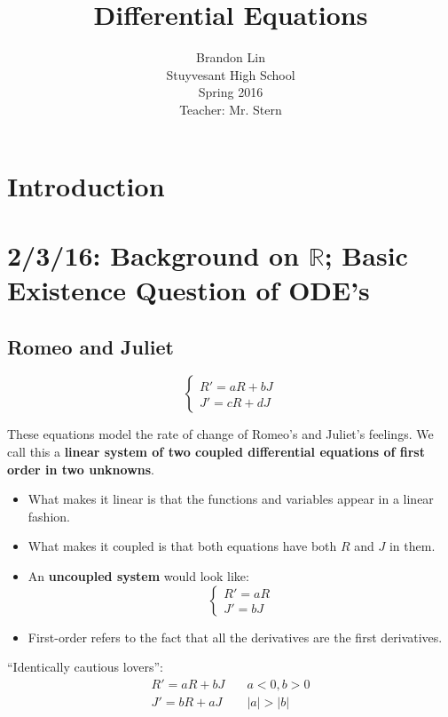 \documentclass[12pt]{article}
\begin{document}
\title{Differential Equations}
\author{Brandon Lin\\Stuyvesant High School\\Spring 2016\\Teacher: Mr. Stern}
\maketitle
\newpage

\tableofcontents 

\newpage
\section*{Introduction}

\section{2/3/16: Background on $\mathbb{R}$; Basic Existence Question of ODE's}
\subsection{Romeo and Juliet}
\[
\begin{cases}
R' = aR + bJ \\
J' = cR + dJ 
\end{cases}
\]

These equations model the rate of change of Romeo's and Juliet's feelings. We call this a \textbf{linear system of two coupled differential equations of first order in two unknowns}. 
\begin{itemize}
\item What makes it linear is that the functions and variables appear in a linear fashion. 
\item What makes it coupled is that both equations have both $R$ and $J$ in them.
\item An \textbf{uncoupled system} would look like:
\[
\begin{cases}
R' = aR \\
J' = bJ
\end{cases}
\] 
\item First-order refers to the fact that all the derivatives are the first derivatives.
\end{itemize}
``Identically cautious lovers'':
\[
\begin{aligned} 
R' = aR + bJ &\quad a<0, b>0 \\
J' = bR + aJ &\quad |a| > |b|
\end{aligned}
\]
\end{document}
